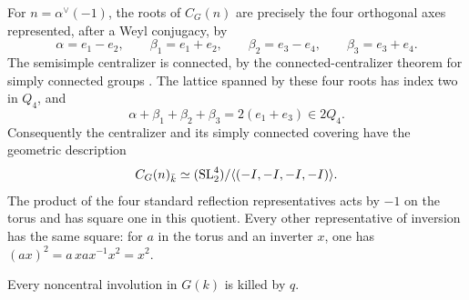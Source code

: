 For $n=\alpha^\vee(-1)$, the roots of $C_G(n)$ are precisely the four
orthogonal axes represented, after a Weyl conjugacy, by
\[
 \alpha=e_1-e_2,\qquad \beta_1=e_1+e_2,
 \qquad\beta_2=e_3-e_4,\qquad\beta_3=e_3+e_4.
\]
The semisimple centralizer is connected, by the connected-centralizer
theorem for simply connected groups
\cite[Section~2.10, p.~53]{SteinbergRegular1965}. The lattice
spanned by these four roots has index two in $Q_4$, and
\[
 \alpha+\beta_1+\beta_2+\beta_3=2(e_1+e_3)\in2Q_4.
\]
Consequently the centralizer and its simply connected covering have the
geometric description
\begin{equation}\label{eq:d4-centralizer}
 C_G(n)_{\bar k}\simeq
 (\operatorname{SL}_2^4)/\langle(-I,-I,-I,-I)\rangle.
\end{equation}
The product of the four standard reflection representatives acts by $-1$
on the torus and has square one in this quotient.  Every other
representative of inversion has the same square: for $a$ in the torus
and an inverter $x$, one has $(ax)^2=a\,xax^{-1}x^2=x^2$.

\begin{lemma}\label{lem:d4-kill-involutions}
Every noncentral involution in $G(k)$ is killed by $q$.
\end{lemma}

